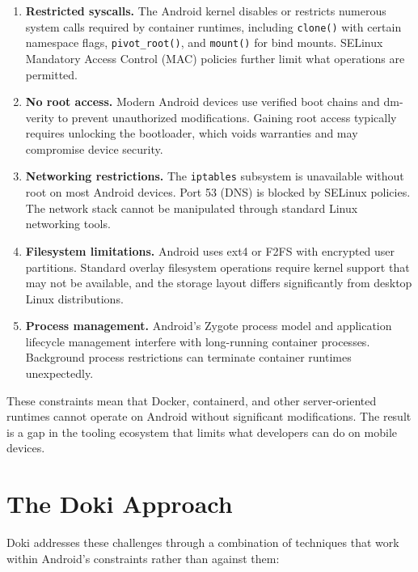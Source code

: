 \begin{enumerate}[leftmargin=*, itemsep=4pt]
  \item \textbf{Restricted syscalls.} The Android kernel disables or
        restricts numerous system calls required by container runtimes,
        including \texttt{clone()} with certain namespace flags,
        \texttt{pivot\_root()}, and \texttt{mount()} for bind mounts.
        SELinux Mandatory Access Control (MAC) policies further limit
        what operations are permitted.

  \item \textbf{No root access.} Modern Android devices use verified
        boot chains and dm-verity to prevent unauthorized modifications.
        Gaining root access typically requires unlocking the bootloader,
        which voids warranties and may compromise device security.

  \item \textbf{Networking restrictions.} The \texttt{iptables}
        subsystem is unavailable without root on most Android devices.
        Port 53 (DNS) is blocked by SELinux policies. The network
        stack cannot be manipulated through standard Linux networking
        tools.

  \item \textbf{Filesystem limitations.} Android uses ext4 or F2FS
        with encrypted user partitions. Standard overlay filesystem
        operations require kernel support that may not be available,
        and the storage layout differs significantly from desktop
        Linux distributions.

  \item \textbf{Process management.} Android's Zygote process model
        and application lifecycle management interfere with long-running
        container processes. Background process restrictions can terminate
        container runtimes unexpectedly.
\end{enumerate}

These constraints mean that Docker, containerd, and other
server-oriented runtimes cannot operate on Android without significant
modifications. The result is a gap in the tooling ecosystem that
limits what developers can do on mobile devices.

\section{The Doki Approach}
\label{sec:approach}

Doki addresses these challenges through a combination of techniques
that work within Android's constraints rather than against them:

